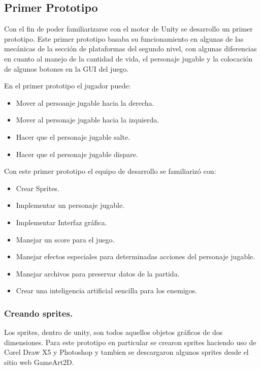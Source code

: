 \subsection{Primer Prototipo}
Con el fin de poder familiarizarse con el motor de Unity
se desarrollo un primer prototipo. Este primer prototipo basaba su funcionamiento 
en algunas de las mecánicas de la sección de plataformas del segundo nivel, con 
algunas diferencias en cuanto al manejo de la cantidad de vida, el personaje 
jugable y la colocación de algunos botones en la GUI del juego.
\\
\par
En el primer prototipo el jugador puede:
\begin{itemize}
	\item Mover al persoanje jugable hacia la derecha.
	\item Mover al personaje jugable hacia la izquierda.
	\item Hacer que el personaje jugable salte.
	\item Hacer que el personaje jugable dispare.
\end{itemize}

Con este primer prototipo el equipo de desarrollo se familiarizó con:
\begin{itemize}
	\item Crear Sprites.
	\item Implementar un personaje jugable.
	\item Implementar Interfaz gráfica.
	\item Manejar un score para el juego.
	\item Manejar efectos especiales para determinadas acciones del personaje jugable.
	\item Manejar archivos para preservar datos de la partida.
	\item Crear una inteligencia artificial sencilla para los enemigos.
\end{itemize}

\subsubsection{Creando sprites.}
Los sprites, dentro de unity, son todos aquellos objetos gráficos de dos 
dimensiones. Para este prototipo en particular se crearon sprites haciendo uso 
de Corel Draw X5 y Photoshop y tambien se descargaron algunos sprites desde 
el sitio web GameArt2D.  %

